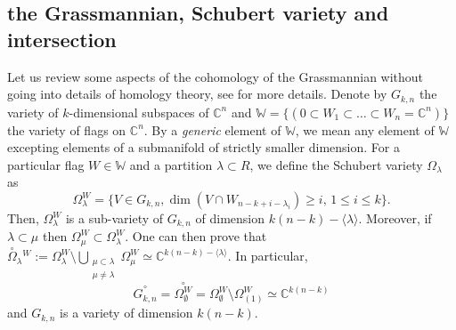 \documentclass[10pt,11pt]{amsart}%
\begin{document}
\subsection{the Grassmannian, Schubert variety and intersection}
Let us review some aspects of the cohomology of the Grassmannian without going into details of homology theory, see \cite{Fulton1997} for more details.  Denote by $G_{k,n}$ the variety of $k$-dimensional subspaces of $\mathbb{C}^n$ and  $\mathbb{W}=\{(0\subset W_1\subset \ldots\subset W_n=\mathbb{C}^n)\}$ the variety of flags on $\mathbb{C}^n$. By a {\it generic} element of $\mathbb{W}$, we mean any element of $\mathbb{W}$ excepting elements of a submanifold of strictly smaller dimension. For a particular flag $W\in \mathbb{W}$ and a partition $\lambda\subset R$, we define the Schubert variety $\Omega_\lambda$ as
$$\Omega_{\lambda}^W=\{V\in G_{k,n}, \dim(V\cap W_{n-k+i-\lambda_i})\geq i,\, 1\leq i\leq k\}.$$
Then, $\Omega^W_{\lambda}$ is a sub-variety of $G_{k,n}$ of dimension $k(n-k)-\langle \lambda\rangle$. Moreover, if $\lambda\subset \mu$ then $\Omega_{\mu}^W\subset \Omega_{\lambda}^W$. One can then prove that $\overset{\circ}{\Omega}_{\lambda} {}^W:=\Omega_{\lambda}^W\setminus\bigcup_{\substack{\mu\subset\lambda\\ \mu\not =\lambda}}\Omega_{\mu}^W\simeq \mathbb{C}^{k(n-k)-\langle \lambda\rangle}$. In particular, 
$$\overset{\circ}{G_{k,n}}=\overset{\circ}{\Omega_{\emptyset}^W}=\Omega_{\emptyset}^W\setminus \Omega_{(1)}^W\simeq \mathbb{C}^{k(n-k)}$$
and $G_{k,n}$ is a variety of dimension $k(n-k)$.
\end{document}
